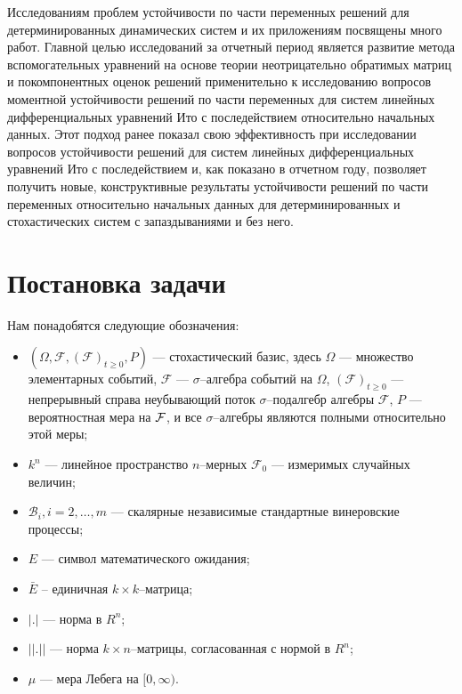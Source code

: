 Исследованиям проблем устойчивости  по части переменных  решений для
детерминированных динамических систем и их приложениям посвящены
много работ. Главной целью исследований за отчетный период является
развитие метода вспомогательных уравнений на основе теории
неотрицательно обратимых матриц и покомпонентных оценок решений
применительно к исследованию вопросов моментной устойчивости решений
по части переменных для систем линейных дифференциальных уравнений
Ито с последействием относительно начальных данных. Этот подход
ранее показал свою эффективность при исследовании вопросов
устойчивости решений для систем линейных дифференциальных уравнений
Ито с последействием и, как показано в отчетном году, позволяет
получить новые, конструктивные результаты устойчивости решений по
части переменных относительно начальных данных для детерминированных
и стохастических систем с запаздываниями и без него.

\section{Постановка задачи}\label{sec:kri-1}

Нам понадобятся следующие обозначения:
\begin{itemize}
    \item $(\Omega , {\mathcal F}, ({\mathcal
    F})_{t\ge0},P)$ --- стохастический базис, здесь $ \Omega $ ---
    множество
    элементарных событий, ${\mathcal F}$ --- $\sigma$--алгебра событий на
    $\Omega$,  $({\mathcal F})_{t\ge 0}$ --- непрерывный справа неубывающий поток
    $\sigma$--подалгебр алгебры ${\mathcal F}$, $P$ --- вероятностная
    мера на ${\cal F}$, и  все $\sigma$--алгебры являются полными относительно этой
    меры;
    \item $k^n$ --- линейное пространство $n$--мерных ${\mathcal F}_0$ ---
    измеримых случайных величин;
    \item $\mathcal B_i,i=2,\dots,m$ --- скалярные независимые стандартные
    винеровские процессы;
    \item  $E$ --- символ математического
    ожидания;
    \item $\bar E$ -- единичная $k \times k$--матрица;
    \item  $|.|$ --- норма в $R^n$;
    \item $||.||$
    --- норма $k\times n$--матрицы, согласованная с нормой в $R^n$;
    \item $\mu$ --- мера Лебега на $[0,\infty)$.
\end{itemize}


